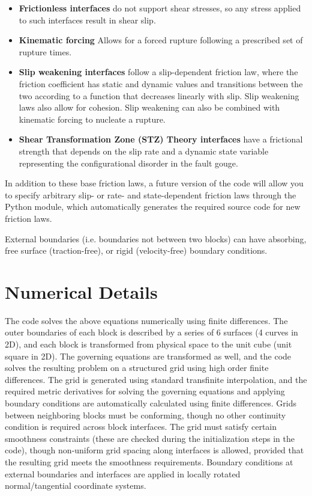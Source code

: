 \documentclass[12pt]{article}   	%
\begin{document}
\begin{itemize}
\item {\bf Frictionless interfaces} do not support shear stresses, so any stress applied to such interfaces result in shear slip.
\item {\bf Kinematic forcing} Allows for a forced rupture following a prescribed set of rupture times.
\item {\bf Slip weakening interfaces} follow a slip-dependent friction law, where the friction coefficient has static and dynamic values and transitions between the two according to a function that decreases linearly with slip. Slip weakening laws also allow for cohesion. Slip weakening can also be combined with kinematic forcing to nucleate a rupture.
\item {\bf Shear Transformation Zone (STZ) Theory interfaces} have a frictional strength that depends on the slip rate and a dynamic state variable representing the configurational disorder in the fault gouge.
\end{itemize}

In addition to these base friction laws, a future version of the code will allow you to specify arbitrary slip- or rate- and state-dependent friction laws through the Python module, which automatically generates the required source code for new friction laws.

External boundaries (i.e. boundaries not between two blocks) can have absorbing, free surface (traction-free), or rigid (velocity-free) boundary conditions.

\section{Numerical Details}

The code solves the above equations numerically using finite differences. The outer boundaries of each block is described by a series of 6 surfaces (4 curves in 2D), and each block is transformed from physical space to the unit cube (unit square in 2D). The governing equations are transformed as well, and the code solves the resulting problem on a structured grid using high order finite differences. The grid is generated using standard transfinite interpolation, and the required metric derivatives for solving the governing equations and applying boundary conditions are automatically calculated using finite differences. Grids between neighboring blocks must be conforming, though no other continuity condition is required across block interfaces. The grid must satisfy certain smoothness constraints (these are checked during the initialization steps in the code), though non-uniform grid spacing along interfaces is allowed, provided that the resulting grid meets the smoothness requirements. Boundary conditions at external boundaries and interfaces are applied in locally rotated normal/tangential coordinate systems.
\end{document}
